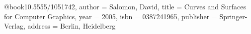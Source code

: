 @book{10.5555/1051742,
author = {Salomon, David},
title = {Curves and Surfaces for Computer Graphics},
year = {2005},
isbn = {0387241965},
publisher = {Springer-Verlag},
address = {Berlin, Heidelberg}
}

  

